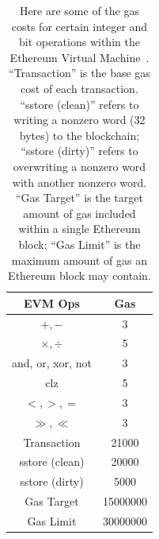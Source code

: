 \begin{table}[pt]
\centering
\begin{tabular}{|c|S[table-format=8.0]|}
\hline
EVM Ops & Gas \\
\hline
    $+,-$ & 3 \\
    $\times,\div$ & 5 \\
    \textsf{and}, \textsf{or}, \textsf{xor}, \textsf{not} & 3 \\
    \textsf{clz} & 5 \\
    $<,>,=$ & 3 \\
    $\gg,\ll$ & 3 \\
\hline
    Transaction             &    21000 \\
    \textsf{sstore} (clean) &    20000 \\
    \textsf{sstore} (dirty) &     5000 \\
    Gas Target              & 15000000 \\
    Gas Limit               & 30000000 \\
\hline
\end{tabular}
\caption[EVM Gas Costs]{Here are some
    of the gas costs for certain integer and bit operations within the
    Ethereum Virtual Machine~\cite{BlockSizesGasLimits,EthereumYellowpaper,eip7939}.
    ``Transaction'' is the base gas cost of each transaction.
    ``\textsf{sstore} (clean)'' refers to writing a nonzero word
    (32 bytes) to the blockchain;
    ``\textsf{sstore} (dirty)'' refers to overwriting a nonzero word
    with another nonzero word.
    ``Gas Target'' is the target amount of gas
    included within a single Ethereum block;
    ``Gas Limit'' is the maximum amount of gas
    an Ethereum block may contain.
    }
\label{table:evm_gas}
\end{table}
